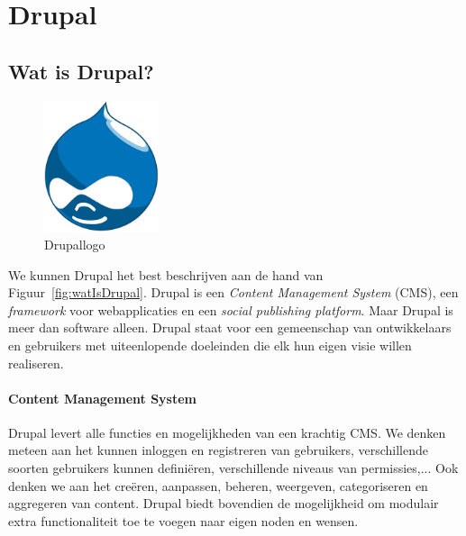 \chapter{Drupal} \label{Drupal}

\section{Wat is Drupal?}

\begin{figure}
\vspace{-40pt}
\centering
\label{fig:drupalLogo}
\includegraphics[width=0.3\textwidth]{fig/drupalLogo}
\vspace{-30pt}
\centering
\caption{Drupallogo}
\centering
\vspace{-40pt}
\end{figure}
We kunnen Drupal het best beschrijven aan de hand van Figuur~\ref{fig:watIsDrupal}.
Drupal is een \textit{Content Management System} (CMS), een \textit{framework} voor webapplicaties en een \textit{social publishing platform}. Maar Drupal is meer dan software alleen. Drupal staat voor een gemeenschap van ontwikkelaars en gebruikers met uiteenlopende doeleinden die elk hun eigen visie willen realiseren. \cite{drupalDefGuide}

\subsubsection{Content Management System}

Drupal levert alle functies en mogelijkheden van een krachtig CMS. We denken meteen aan het kunnen inloggen en registreren van gebruikers, verschillende soorten gebruikers kunnen defini\"{e}ren, verschillende niveaus van permissies,... Ook denken we aan het cre\"{e}ren, aanpassen, beheren, weergeven, categoriseren en aggregeren van content. Drupal biedt bovendien de mogelijkheid om modulair extra functionaliteit toe te voegen naar eigen noden en wensen.

